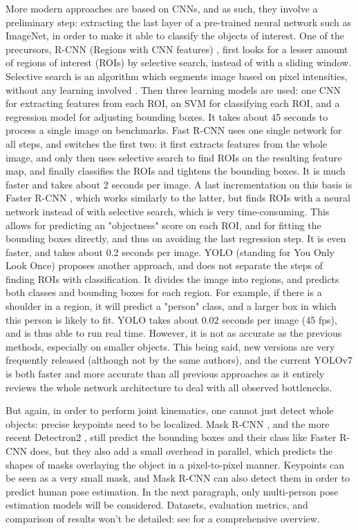 \clearpage
More modern approaches are based on CNNs, and as such, they involve a preliminary step: extracting the last layer of a pre-trained neural network such as ImageNet, in order to make it able to classify the objects of interest. One of the precursors, R-CNN (Regions with CNN features) \cite{Girshick2014}, first looks for a lesser amount of regions of interest (ROIs) by selective search, instead of with a sliding window. Selective search is an algorithm which segments image based on pixel intensities, without any learning involved \cite{Uijlings2013}. Then three learning models are used: one CNN for extracting features from each ROI, an SVM for classifying each ROI, and a regression model for adjusting bounding boxes. It takes about 45 seconds to process a single image on benchmarks. Fast R-CNN \cite{Girshick2015} uses one single network for all steps, and switches the first two: it first extracts features from the whole image, and only then uses selective search to find ROIs on the resulting feature map, and finally classifies the ROIs and tightens the bounding boxes. It is much faster and takes about 2 seconds per image. A last incrementation on this basis is Faster R-CNN \cite{Ren2015}, which works similarly to the latter, but finds ROIs with a neural network instead of with selective search, which is very time-consuming. This allows for predicting an "objectness" score on each ROI, and for fitting the bounding boxes directly, and thus on avoiding the last regression step. It is even faster, and takes about 0.2 seconds per image. YOLO (standing for You Only Look Once) \cite{Redmon2016} proposes another approach, and does not separate the steps of finding ROIs with classification. It divides the image into regions, and predicts both classes and bounding boxes for each region. For example, if there is a shoulder in a region, it will predict a "person" class, and a larger box in which this person is likely to fit. YOLO takes about 0.02 seconds per image (45 fps), and is thus able to run real time. However, it is not as accurate as the previous methods, especially on smaller objects. This being said, new versions are very frequently released (although not by the same authors), and the current YOLOv7 \cite{Wang2022b} is both faster and more accurate than all previous approaches as it entirely reviews the whole network architecture to deal with all observed bottlenecks.

But again, in order to perform joint kinematics, one cannot just detect whole objects: precise keypoints need to be localized. Mask R-CNN \cite{He2017}, and the more recent Detectron2 \cite{Wu2019}, still predict the bounding boxes and their class like Faster R-CNN does, but they also add a small overhead in parallel, which predicts the shapes of masks overlaying the object in a pixel-to-pixel manner. Keypoints can be seen as a very small mask, and Mask R-CNN can also detect them in order to predict human pose estimation. In the next paragraph, only multi-person pose estimation models will be considered. Datasets, evaluation metrics, and comparison of results won't be detailed: see \cite{Topham2021} for a comprehensive overview.

